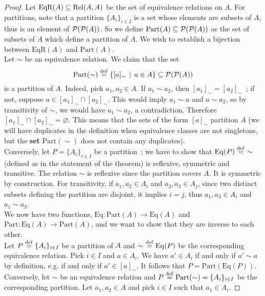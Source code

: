 \begin{proof}
    Let $\mathrm{EqR}(A) \subseteq \mathrm{Rel}(A,A)$ be the set of equivalence relations on $A$. For partitions, note that a partition $\{A_i\}_{i \in I}$ is a set whose elements are subsets of $A$, thus is an element of $\operatorname{\mathcal P}(\operatorname{\mathcal P}(A))$. So we define $\mathrm{Part}(A) \subseteq \operatorname{\mathcal P}(\operatorname{\mathcal P}(A))$ as the set of subsets of $A$ which define a partition of $A$. We wish to establish a bijection between $\mathrm{EqR}(A)$ and $\mathrm{Part}(A)$. 
    \\

    Let $\sim$ be an equivalence relation. We claim that the set
    \[
        \mathrm{Part}(\sim) \overset{\mathrm{def}}{=} \{ [a]_{\sim} \, \mid \, a \in A \} \subseteq \operatorname{\mathcal P}(\operatorname{\mathcal P}(A))
    \]
    is a partition of $A$. Indeed, pick $a_1,a_2 \in A$. If $a_1 \sim a_2$, then $[a_1]_{\sim} = [a_2]_{\sim}$~; if not, suppose $a \in [a_1]_{\sim} \cap [a_2]_{\sim}$. This would imply $a_1 \sim a$ and $a \sim a_2$, so by transitivity of $\sim$, we would have $a_1 \sim a_2$, a contradiction. Therefore $[a_1]_{\sim} \cap [a_2]_{\sim} = \varnothing$. This means that the sets of the form $[a]_{\sim}$ partition $A$ (we will have duplicates in the definition when equivalence classes are not singletons, but the \textbf{set} $\mathrm{Part}(\sim)$ does not contain any duplicates). 
    \\

    Conversely, let $P = \{A_i\}_{i \in I}$ be a partition~; we have to show that $\mathrm{Eq}(P) \overset{\mathrm{def}}{=} \,\, \sim$ (defined as in the statement of the theorem) is reflexive, symmetric and transitive. The relation $\sim$ is reflexive since the partition covers $A$. It is symmetric by construction. For transitivity, if $a_1,a_2 \in A_i$ and $a_2,a_3 \in A_j$, since two distinct subsets defining the partition are disjoint, it implies $i=j$, thus $a_1,a_3 \in A_i$ and $a_1 \sim a_3$. 
    \\

    We now have two functions, $\mathrm{Eq} : \mathrm{Part}(A) \to \mathrm{Eq}(A)$ and $\mathrm{Part} : \mathrm{Eq}(A) \to \mathrm{Part}(A)$, and we want to show that they are inverse to each other. 
    \\

    Let $P \overset{\mathrm{def}}{=} \{A_i\}_{i \in I}$ be a partition of $A$ and $\sim \,\, \overset{\mathrm{def}}{=} \mathrm{Eq}(P)$ be the corresponding equivalence relation. Pick $i \in I$ and $a \in A_i$. We have $a' \in A_i$ if and only if $a' \sim a$ by definition, e.g. if and only if $a' \in [a]_{\sim}$. It follows that $P = \mathrm{Part}(\mathrm{Eq}(P))$. 
    \\

    Conversely, let $\sim$ be an equivalence relation and $P \overset{\mathrm{def}}{=} \mathrm{Part}(\sim) = \{A_i\}_{i \in I}$ be the corresponding partition. Let $a_1,a_2 \in A$ and pick $i \in I$ such that $a_1 \in A_i$. 
\end{proof}

